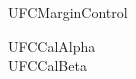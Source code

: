 \documentclass{abntexto-ufc}
\begin{document}
\textual

\noindent UFCMarginControl\par

\vspace{\baselineskip}
\begingroup
\singlesp
\noindent UFCCalAlpha\\
UFCCalBeta\par
\endgroup

\nocite{rlalpha,rlbeta}
\ufcPrintReferences
\end{document}
